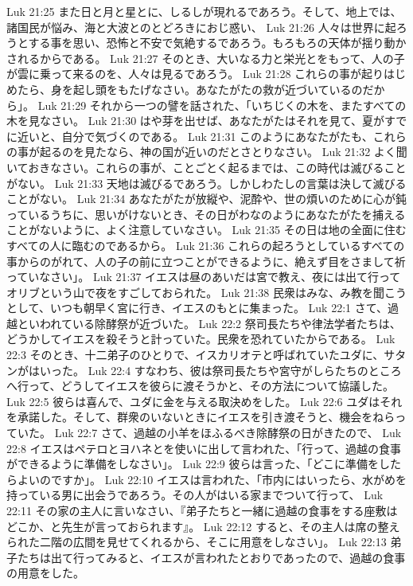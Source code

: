 Luk 21:25  また日と月と星とに、しるしが現れるであろう。そして、地上では、諸国民が悩み、海と大波とのとどろきにおじ惑い、
Luk 21:26  人々は世界に起ろうとする事を思い、恐怖と不安で気絶するであろう。もろもろの天体が揺り動かされるからである。
Luk 21:27  そのとき、大いなる力と栄光とをもって、人の子が雲に乗って来るのを、人々は見るであろう。
Luk 21:28  これらの事が起りはじめたら、身を起し頭をもたげなさい。あなたがたの救が近づいているのだから」。
Luk 21:29  それから一つの譬を話された、「いちじくの木を、またすべての木を見なさい。
Luk 21:30  はや芽を出せば、あなたがたはそれを見て、夏がすでに近いと、自分で気づくのである。
Luk 21:31  このようにあなたがたも、これらの事が起るのを見たなら、神の国が近いのだとさとりなさい。
Luk 21:32  よく聞いておきなさい。これらの事が、ことごとく起るまでは、この時代は滅びることがない。
Luk 21:33  天地は滅びるであろう。しかしわたしの言葉は決して滅びることがない。
Luk 21:34  あなたがたが放縦や、泥酔や、世の煩いのために心が鈍っているうちに、思いがけないとき、その日がわなのようにあなたがたを捕えることがないように、よく注意していなさい。
Luk 21:35  その日は地の全面に住むすべての人に臨むのであるから。
Luk 21:36  これらの起ろうとしているすべての事からのがれて、人の子の前に立つことができるように、絶えず目をさまして祈っていなさい」。
Luk 21:37  イエスは昼のあいだは宮で教え、夜には出て行ってオリブという山で夜をすごしておられた。
Luk 21:38  民衆はみな、み教を聞こうとして、いつも朝早く宮に行き、イエスのもとに集まった。
Luk 22:1  さて、過越といわれている除酵祭が近づいた。
Luk 22:2  祭司長たちや律法学者たちは、どうかしてイエスを殺そうと計っていた。民衆を恐れていたからである。
Luk 22:3  そのとき、十二弟子のひとりで、イスカリオテと呼ばれていたユダに、サタンがはいった。
Luk 22:4  すなわち、彼は祭司長たちや宮守がしらたちのところへ行って、どうしてイエスを彼らに渡そうかと、その方法について協議した。
Luk 22:5  彼らは喜んで、ユダに金を与える取決めをした。
Luk 22:6  ユダはそれを承諾した。そして、群衆のいないときにイエスを引き渡そうと、機会をねらっていた。
Luk 22:7  さて、過越の小羊をほふるべき除酵祭の日がきたので、
Luk 22:8  イエスはペテロとヨハネとを使いに出して言われた、「行って、過越の食事ができるように準備をしなさい」。
Luk 22:9  彼らは言った、「どこに準備をしたらよいのですか」。
Luk 22:10  イエスは言われた、「市内にはいったら、水がめを持っている男に出会うであろう。その人がはいる家までついて行って、
Luk 22:11  その家の主人に言いなさい、『弟子たちと一緒に過越の食事をする座敷はどこか、と先生が言っておられます』。
Luk 22:12  すると、その主人は席の整えられた二階の広間を見せてくれるから、そこに用意をしなさい」。
Luk 22:13  弟子たちは出て行ってみると、イエスが言われたとおりであったので、過越の食事の用意をした。
